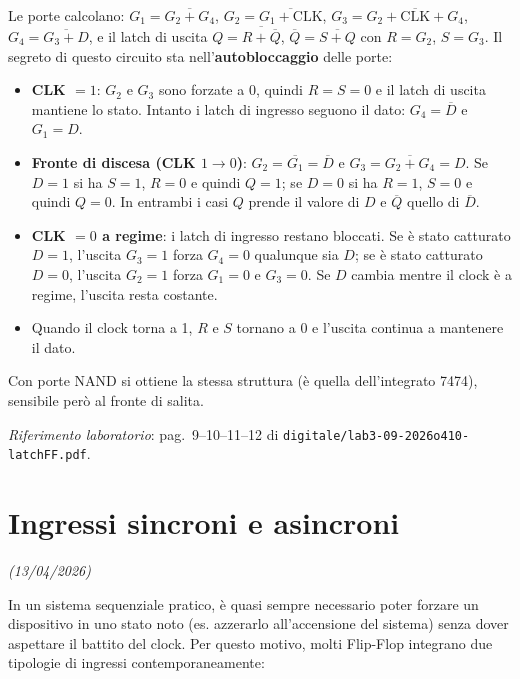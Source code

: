 \noindent Le porte calcolano: $G_1=\overline{G_2+G_4}$, $G_2=\overline{G_1+\text{CLK}}$,
$G_3=\overline{G_2+\text{CLK}+G_4}$, $G_4=\overline{G_3+D}$, e il latch di uscita
$Q=\overline{R+\overline{Q}}$, $\overline{Q}=\overline{S+Q}$ con $R=G_2$, $S=G_3$.
Il segreto di questo circuito sta nell'\textbf{autobloccaggio} delle porte:
\begin{itemize}[leftmargin=1.5em,itemsep=2pt]
  \item \textbf{CLK $=1$}: $G_2$ e $G_3$ sono forzate a 0, quindi $R=S=0$ e il latch di
        uscita mantiene lo stato. Intanto i latch di ingresso seguono il dato:
        $G_4=\overline{D}$ e $G_1=D$.
  \item \textbf{Fronte di discesa (CLK $1\to 0$)}: $G_2=\overline{G_1}=\overline{D}$ e
        $G_3=\overline{G_2+G_4}=D$. Se $D=1$ si ha $S=1$, $R=0$ e quindi $Q=1$; se $D=0$ si ha
        $R=1$, $S=0$ e quindi $Q=0$. In entrambi i casi $Q$ prende il valore di $D$ e
        $\overline{Q}$ quello di $\overline{D}$.
  \item \textbf{CLK $=0$ a regime}: i latch di ingresso restano bloccati. Se è stato
        catturato $D=1$, l'uscita $G_3=1$ forza $G_4=0$ qualunque sia $D$; se è stato
        catturato $D=0$, l'uscita $G_2=1$ forza $G_1=0$ e $G_3=0$. Se $D$ cambia mentre il
        clock è a regime, l'uscita resta costante.
  \item Quando il clock torna a 1, $R$ e $S$ tornano a 0 e l'uscita continua a mantenere
        il dato.
\end{itemize}
Con porte NAND si ottiene la stessa struttura (è quella dell'integrato 7474), sensibile però
al fronte di salita.

\noindent\textit{Riferimento laboratorio}: pag.\ 9–10–11–12 di
\texttt{digitale/lab3-09-2026o410-latchFF.pdf}.

\section{Ingressi sincroni e asincroni}
\label{sec:sincroni_asincroni}

\textit{(13/04/2026)}

In un sistema sequenziale pratico, è quasi sempre necessario poter forzare un dispositivo in uno stato noto (es. azzerarlo all'accensione del sistema) senza dover aspettare il battito del clock. Per questo motivo, molti Flip-Flop integrano due tipologie di ingressi contemporaneamente:

